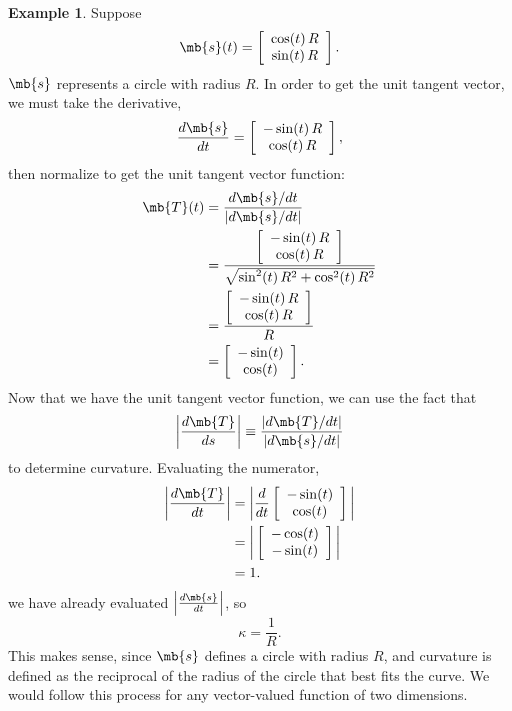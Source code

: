 \documentclass[11pt]{article}
\theoremstyle{definition}
\newtheorem{ex}{Example}[section]
\begin{document}
\begin{ex}Suppose 
\begin{align*}
&\mb{s}(t) = \left[\begin{array}{c}\cos(t)\,R \\\sin(t)\,R\end{array}\right].\\
\end{align*}
$\mb{s}$ represents a circle with radius $R$. In order to get the unit tangent vector, we must take the derivative,
\begin{align*}
&\frac{ d \mb{s}}{ d t} = \left[\begin{array}{c}-\sin(t)\,R \\\cos(t)\,R\end{array}\right],\\
\end{align*}
then normalize to get the unit tangent vector function:
\begin{align*}
\mb{T}(t) &= \frac{ d \mb{s}/ d t}{| d \mb{s}/ d t|}\\
&= \frac{\left[\begin{array}{c}-\sin(t)\,R \\\cos(t)\,R\end{array}\right]}{\sqrt{\sin^2(t)\,R^2 + \cos^2(t)\,R^2}}\\
&= \frac{\left[\begin{array}{c}-\sin(t)\,R \\\cos(t)\,R\end{array}\right]}{R}\\
&=\left[\begin{array}{c}-\sin(t) \\\cos(t)\end{array}\right].
\end{align*}
Now that we have the unit tangent vector function, we can use the fact that
$$ 
\left|\frac{ d \mb{T}}{ d {s}}\right|\equiv \frac{|{ d \mb{T}}/{ d t}|}{|{ d \mb{s}}/{ d t}|}
$$
to determine curvature. Evaluating the numerator,
\begin{align*}
\bigg|\frac{ d \mb{T}}{ d t}\bigg| &= \bigg|\frac{ d }{ d t}\left[\begin{array}{c}-\sin(t) \\\cos(t)\end{array}\right]\bigg|\\
&= \bigg|\left[\begin{array}{c}-\cos(t) \\-\sin(t)\end{array}\right]\bigg|\\
&= 1.
\end{align*}
we have already evaluated $\left|\frac{ d \mb{s}}{ d {t}}\right|$, so
$$
\kappa = \frac{1}{R}.
$$
This makes sense, since $\mb{s}$ defines a circle with radius $R$, and curvature is defined as the reciprocal of the radius of the circle that best fits the curve. We would follow this process for any vector-valued function of two dimensions.\end{ex}
\end{document}
